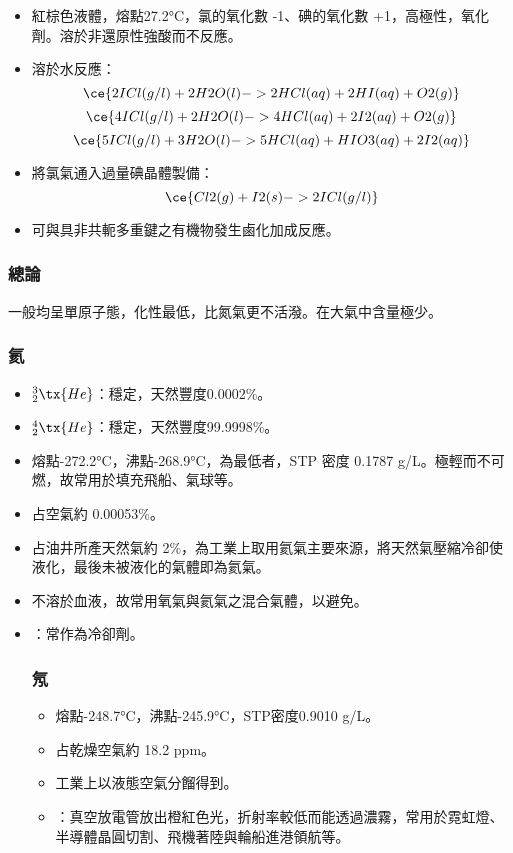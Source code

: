 \documentclass[a4paper,12pt]{report}
\begin{document}
\begin{itemize}
\begin{itemize}
\item 紅棕色液體，熔點27.2°C，氯的氧化數 -1、碘的氧化數 +1，高極性，氧化劑。溶於非還原性強酸而不反應。
\item 溶於水反應：
\[\ce{2ICl(g/l) + 2H2O(l) -> 2HCl(aq) + 2HI(aq) + O2(g)}\]
\[\ce{4ICl(g/l) + 2H2O(l) -> 4HCl(aq) + 2I2(aq) + O2(g)}\]
\[\ce{5ICl(g/l) + 3H2O(l) -> 5HCl(aq) + HIO3(aq) + 2I2(aq)}\]
\item 將氯氣通入過量碘晶體製備：
\[\ce{Cl2(g) + I2(s) -> 2ICl(g/l)}\]
\item 可與具非共軛多重鍵之有機物發生鹵化加成反應。
\end{itemize}
\subsubsection{總論}
一般均呈單原子態，化性最低，比氮氣更不活潑。在大氣中含量極少。
\subsubsection{氦}
\begin{itemize}
\item $^3_2\tx{He}$：穩定，天然豐度0.0002\%。
\item $^4_2\tx{He}$：穩定，天然豐度99.9998\%。
\item 熔點-272.2°C，沸點-268.9°C，為最低者，STP 密度 0.1787 g/L。極輕而不可燃，故常用於填充飛船、氣球等。
\item 占空氣約 0.00053\%。
\item 占油井所產天然氣約 2\%，為工業上取用氦氣主要來源，將天然氣壓縮冷卻使液化，最後未被液化的氣體即為氦氣。
\item 不溶於血液，故常用氧氣與氦氣之混合氣體，以避免。
\item {}：常作為冷卻劑。
\eit
\subsubsection{氖}
\begin{itemize}
\item 熔點-248.7°C，沸點-245.9°C，STP密度0.9010 g/L。
\item 占乾燥空氣約 18.2 ppm。
\item 工業上以液態空氣分餾得到。
\item {}：真空放電管放出橙紅色光，折射率較低而能透過濃霧，常用於霓虹燈、半導體晶圓切割、飛機著陸與輪船進港領航等。
\end{itemize}

\end{itemize}
\end{itemize}
\end{document}
